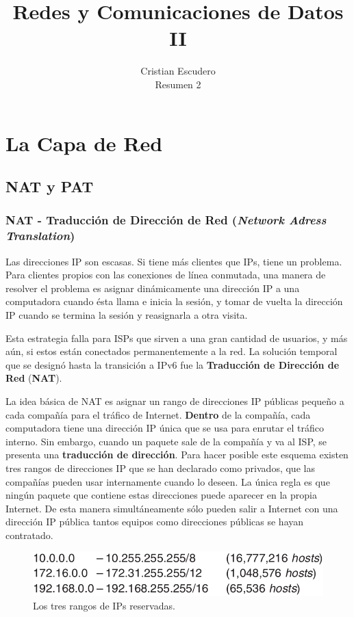 \documentclass[10pt,a4paper]{article}
\title{Redes y Comunicaciones de Datos II}
\author{Cristian Escudero \\ \small{Resumen 2}}
\begin{document}
\maketitle

\section{La Capa de Red}

\subsection{NAT y PAT}

\subsubsection{NAT - Traducción de Dirección de Red (\textit{Network Adress Translation})}

Las direcciones IP son escasas. Si tiene más clientes que IPs, tiene un problema. Para clientes propios con las conexiones de línea conmutada, una manera de resolver el problema es asignar dinámicamente una dirección IP a una computadora cuando ésta llama e inicia la sesión, y tomar de vuelta la dirección IP cuando se termina la sesión y reasignarla a otra visita.

Esta estrategia falla para ISPs que sirven a una gran cantidad de usuarios, y más aún, si estos están conectados permanentemente a la red. La solución temporal que se designó hasta la transición a IPv6 fue la \textbf{Traducción de Dirección de Red} (\textbf{NAT}).

La idea básica de NAT es asignar un rango de direcciones IP públicas pequeño a cada compañía para el tráfico de Internet. \textbf{Dentro} de la compañía, cada computadora tiene una dirección IP única que se usa para enrutar el tráfico interno. Sin embargo, cuando un paquete sale de la compañía y va al ISP, se presenta una \textbf{traducción de dirección}. Para hacer posible este esquema existen tres rangos de direcciones IP que se han declarado como privados, que las compañías pueden usar internamente cuando lo deseen. La única regla es que ningún paquete que contiene estas direcciones puede aparecer en la propia Internet. De esta manera simultáneamente sólo pueden salir a Internet con una dirección IP pública tantos equipos como direcciones públicas se hayan contratado.

\begin{figure}
  \caption{Los tres rangos de IPs reservadas.}
  \label{fig:ips_reservada}
  \centering
  \hbox{\includegraphics[width=0.45\textwidth-\fboxrule-\fboxrule]{imgs/ips_reservada.png}}
\end{figure}
\end{document}
